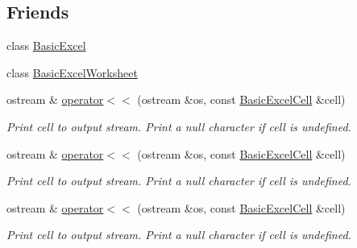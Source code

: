 \subsection*{Friends}
\begin{DoxyCompactItemize}
\item 
class \hyperlink{class_y_excel_1_1_basic_excel_cell_a6c5913fd086d459fd698f3123c8d001c}{Basic\+Excel}
\item 
class \hyperlink{class_y_excel_1_1_basic_excel_cell_a0a2195bc0fd889f6d4702d755bb424e9}{Basic\+Excel\+Worksheet}
\item 
ostream \& \hyperlink{class_y_excel_1_1_basic_excel_cell_a5d002140fe68cdd617a04fc2a3d5b025}{operator$<$$<$} (ostream \&os, const \hyperlink{class_y_excel_1_1_basic_excel_cell}{Basic\+Excel\+Cell} \&cell)
\begin{DoxyCompactList}\small\item\em Print cell to output stream. Print a null character if cell is undefined. \end{DoxyCompactList}\item 
ostream \& \hyperlink{class_y_excel_1_1_basic_excel_cell_a5d002140fe68cdd617a04fc2a3d5b025}{operator$<$$<$} (ostream \&os, const \hyperlink{class_y_excel_1_1_basic_excel_cell}{Basic\+Excel\+Cell} \&cell)
\begin{DoxyCompactList}\small\item\em Print cell to output stream. Print a null character if cell is undefined. \end{DoxyCompactList}\item 
ostream \& \hyperlink{class_y_excel_1_1_basic_excel_cell_a5d002140fe68cdd617a04fc2a3d5b025}{operator$<$$<$} (ostream \&os, const \hyperlink{class_y_excel_1_1_basic_excel_cell}{Basic\+Excel\+Cell} \&cell)
\begin{DoxyCompactList}\small\item\em Print cell to output stream. Print a null character if cell is undefined. \end{DoxyCompactList}\end{DoxyCompactItemize}


